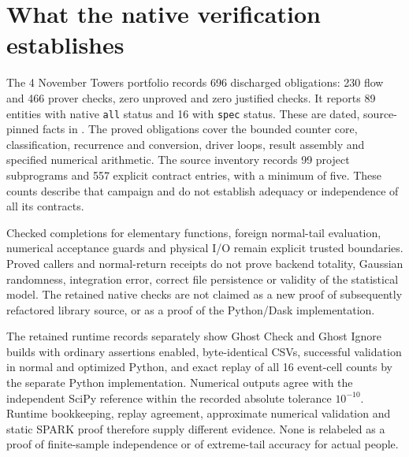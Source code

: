 \section{What the native verification establishes}

The 4 November Towers portfolio records 696 discharged obligations:
230 flow and 466 prover checks, zero unproved and zero justified checks.
It reports 89 entities with native \texttt{all} status and 16 with
\texttt{spec} status. These are dated, source-pinned facts in
.
The proved obligations cover the bounded counter core, classification,
recurrence and conversion, driver loops, result assembly and specified
numerical arithmetic. The source inventory records 99 project subprograms
and 557 explicit contract entries, with a minimum of five. These counts
describe that campaign and do not establish adequacy or independence of
all its contracts.

Checked completions for elementary functions, foreign normal-tail evaluation,
numerical acceptance guards and physical I/O remain explicit trusted
boundaries. Proved callers and normal-return receipts do not prove backend
totality, Gaussian randomness, integration error, correct file persistence
or validity of the statistical model. The retained native checks are not
claimed as a new proof of subsequently refactored library source, or as a
proof of the Python/Dask implementation.

The retained runtime records separately show Ghost Check and Ghost Ignore
builds with ordinary assertions enabled, byte-identical CSVs, successful
validation in normal and optimized Python, and exact replay of all 16
event-cell counts by the separate Python implementation. Numerical outputs
agree with the independent SciPy reference within the recorded absolute
tolerance \(10^{-10}\). Runtime bookkeeping, replay agreement, approximate
numerical validation and static SPARK proof therefore supply different
evidence. None is relabeled as a proof of finite-sample independence or of
extreme-tail accuracy for actual people.
